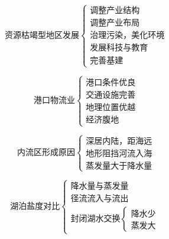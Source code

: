 \documentclass[UTF8]{ctexart}
\begin{document}
\begin{multicols}{2}
    
    \[
        \textbf{资源枯竭型地区发展}
        \begin{cases}
            \text{调整产业结构}\\
            \text{调整产业布局}\\
            \text{治理污染，美化环境}\\
            \text{发展科技与教育}\\
            \text{完善基建}
        \end{cases}
    \]

    \[
        \textbf{港口物流业}
        \begin{cases}
            \text{港口条件优良}\\
            \text{交通设施完善}\\
            \text{地理位置优越}\\
            \text{经济腹地}
        \end{cases}
    \]

\end{multicols}

\par

\begin{multicols}{2}

    \[
        \textbf{内流区形成原因}
        \begin{cases}
            \text{深居内陆，距海远}\\
            \text{地形阻挡河流入海}\\
            \text{蒸发量大于降水量}
        \end{cases}
    \]

    \[
        \textbf{湖泊盐度对比}
        \begin{cases}
            \text{降水量与蒸发量}\\
            \text{径流流入与流出}\\
            \text{封闭湖水交换}
            \begin{cases}
                \text{降水少}\\
                \text{蒸发大}
            \end{cases}
        \end{cases}
    \]
    
\end{multicols}

\end{document}
